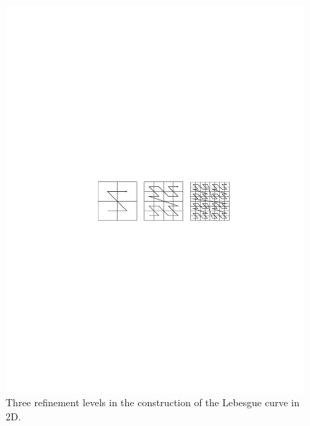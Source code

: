 \begin{figure}
    \centering
    \includegraphics[scale=1.0, viewport = 150 350 500 435, clip]{figures/lebesgue.pdf}
    \caption{\footnotesize{Three refinement levels in the construction of the Lebesgue 
	curve in 2D.}}
    \label{fig:lebesgue}
\end{figure}

